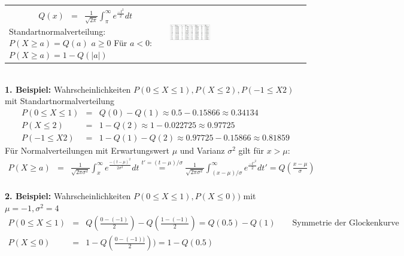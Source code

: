 \begin{tabular}{ll}
 \addtolength{\jot}{2mm}
 \parbox{4cm}{
 \begin{eqnarray*}
Q(x) &=& \frac{1}{\sqrt{2 \pi}} \int_{\pi}^{\infty} e^{\frac{-t^2}{2}}dt\\ 
 \end{eqnarray*}
Standartnormalverteilung: \\
$P(X \geq a) = Q(a)$ \quad $a \geq 0$ \\
Für $ a < 0$: \\
$P(X \geq a) = 1-Q(\vert a \vert)$
 }
 &
 \addtolength{\jot}{2mm}
 \parbox{5cm}{
\begin{center}
 \includegraphics[width=0.30\textwidth]{img/Q-Funktion.jpg}
\end{center}}
\end{tabular}\\
\vspace{10pt}
\textbf{1. Beispiel:} Wahrscheinlichkeiten $P(0 \leq X \leq 1), P(X \leq 2), P(-1 \leq X 2)$ mit Standartnormalverteilung
\begin{eqnarray*}
P(0 \leq X \leq 1) &=& Q(0) - Q(1) \approx 0.5 - 0.15866 \approx 0.34134\\
P(X \leq 2) &=& 1 - Q(2) \approx 1 - 0.022725 \approx 0.97725\\
P(-1 \leq X 2) &=& 1-Q(1)-Q(2) \approx 0.97725-0.15866 \approx 0.81859
\end{eqnarray*}
\vspace{10pt}
Für Normalverteilungen mit Erwartungswert $\mu$ und Varianz $\sigma^2$ gilt für $x > \mu$:
\begin{eqnarray*}
P(X \geq a) &=& \frac{1}{\sqrt{2 \pi \sigma^2}} \int_x^{\infty} e^{\frac{-(t-\mu)^2}{2 \sigma^2}} dt \overset{t' =(t-\mu)/\sigma}{=} \frac{1}{\sqrt{2 \pi \sigma^2}} \int_{(x-\mu)/ \sigma}^{\infty} e^{\frac{-t'^2}{2}} dt' = Q\left(\frac{x-\mu}{\sigma}\right) 
\end{eqnarray*}\\
\vspace{10pt}
\textbf{2. Beispiel:} Wahrscheinlichkeiten $P(0 \leq X \leq 1), P(X \leq 0))$ mit $\mu = -1, \sigma^2 = 4$
\begin{eqnarray*}
P(0 \leq X \leq 1) &=& Q\left(\frac{0- (-1)}{2}\right) -  Q\left(\frac{ 1 - (-1)}{2}\right) = Q(0.5) - Q(1) \qquad \text{Symmetrie der Glockenkurve} \\
P(X \leq 0) &=& 1 - Q\left(\frac{0 - (-1))}{2}\right)) = 1 - Q(0.5)\\
\end{eqnarray*}
